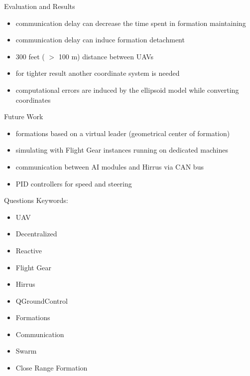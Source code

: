 \documentclass{beamer}
\begin{document}
\begin{frame}{Evaluation and Results}
\begin{itemize}
\item communication delay can decrease the time spent in formation maintaining
\item communication delay can induce formation detachment
\item 300 feet ( $>$ 100 m) distance between UAVs
\item for tighter result another coordinate system is needed
\item computational errors are induced by the ellipsoid model while converting coordinates

\end{itemize}
\end{frame}
\begin{frame}{Future Work}
\begin{itemize}
\item formations based on a virtual leader (geometrical center of formation)
\item simulating with Flight Gear instances running on dedicated machines
\item communication between AI modules and Hirrus via CAN bus
\item PID controllers for speed and steering
\end{itemize}
\end{frame}

\begin{frame}{Questions}
Keywords:
\begin{itemize}
\item UAV
\item Decentralized
\item Reactive
\item Flight Gear
\item Hirrus
\item QGroundControl
\item Formations
\item Communication
\item Swarm
\item Close Range Formation
\end{itemize}
\end{frame}
\end{document}
